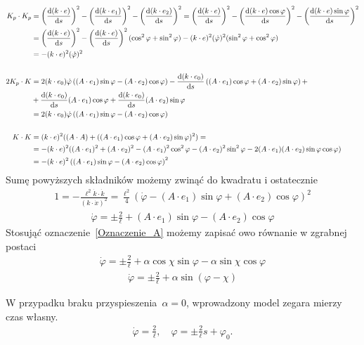 \begin{align*}
K_p\cdot K_p &= \left(  \frac{\text{d} (k\cdot e)}{\text{d} s} \right)^2 
		- \left( \frac{\text{d} (k\cdot e_1)}{\text{d} s} \right)^2 
		- \left( \frac{\text{d} (k\cdot e_2)}{\text{d} s} \right)^2 
		= \left(  \frac{\text{d} (k\cdot e)}{\text{d} s} \right)^2 
		- \left( \frac{\text{d} (k\cdot e)\cos\varphi}{\text{d} s} \right)^2 
		- \left( \frac{\text{d} (k\cdot e)\sin\varphi}{\text{d} s} \right)^2 
	\\ &= \left(  \frac{\text{d} (k\cdot e)}{\text{d} s} \right)^2 
		- \left( \frac{\text{d} (k\cdot e)}{\text{d} s} 
            \right)^2 (\cos^2\varphi + \sin^2\varphi)
		- (k\cdot e)^2  (\dot{\varphi} )^2 (\sin^2\varphi + \cos^2\varphi) 
	\\ &= - (k\cdot e)^2  (\dot{\varphi} )^2 
	\\
	\\
2K_p\cdot K &= 2(k\cdot e_0 ) \dot{\varphi} \left( (A\cdot e_1) 
                \sin\varphi -(A\cdot e_2) \cos\varphi \right) 
        -\frac{\text{d}(k\cdot e_0)}{\text{d} s} \left((A\cdot e_1)\cos\varphi + 
                (A\cdot e_2) \sin\varphi \right)+
    \\ &+\frac{\text{d}(k\cdot e_0)}{\text{d} s} (A\cdot e_1)\cos\varphi 
        +\frac{\text{d}(k\cdot e_0)}{\text{d} s} (A\cdot e_2)\sin\varphi 
    \\ &=2(k\cdot e_0 ) \dot{\varphi} \left( (A\cdot e_1) \sin\varphi -
                (A\cdot e_2) \cos\varphi \right) 
	\\
	\\
K\cdot K &= (k\cdot e)^2 ( (A\cdot A ) +( \left(A\cdot e_1\right)\cos\varphi+
                    \left(A\cdot e_2\right)\sin\varphi )^2) =
    \\   &=- (k\cdot e)^2( (A\cdot e_1 )^2 + (A\cdot e_2)^2 -
                    (A\cdot e_1)^2\cos^2\varphi - (A\cdot e_2)^2\sin^2\varphi
            - 2 (A\cdot e_1) (A\cdot e_2) \sin\varphi\cos\varphi )
    \\   &=- (k\cdot e)^2\left( (A\cdot e_1) \sin\varphi -
                    (A\cdot e_2) \cos\varphi \right)^2
\end{align*}
Sumę powyższych składników możemy zwinąć do kwadratu i ostatecznie 
\begin{align*}
1 = -\frac{\ell^2\dot{k}\cdot \dot{k}}{(k\cdot \dot{x})^2}  =
\frac{\ell^2}{4} 
( \dot{\varphi} -(A\cdot e_1) \sin\varphi +(A\cdot e_2) \cos\varphi )^2 
\end{align*}
\begin{align*}
\dot{\varphi} = \pm \frac{2}{\ell} +
(A\cdot e_1) \sin\varphi - (A\cdot e_2) \cos\varphi 
\end{align*}
Stosująć oznaczenie~\ref{Oznaczenie_A} możemy zapisać owo równanie w 
zgrabnej postaci
\begin{align*}
\dot{\varphi}   =\pm \frac{2}{\ell} + \alpha \cos\chi \sin\varphi -
\alpha \sin\chi \cos\varphi  
\end{align*}
\begin{align}\label{phi_equation}
\boxed{
\dot{\varphi}   = \pm \frac{2}{\ell} +\alpha \sin ( \varphi -\chi )
}
\end{align}

W przypadku braku 
przyspieszenia~$\alpha=0$, wprowadzony model zegara mierzy czas własny.
\begin{align}
\dot{\varphi} = \frac{2}{\ell},\quad
\varphi =\pm \frac{2}{\ell} s + \varphi_0.
\end{align}

